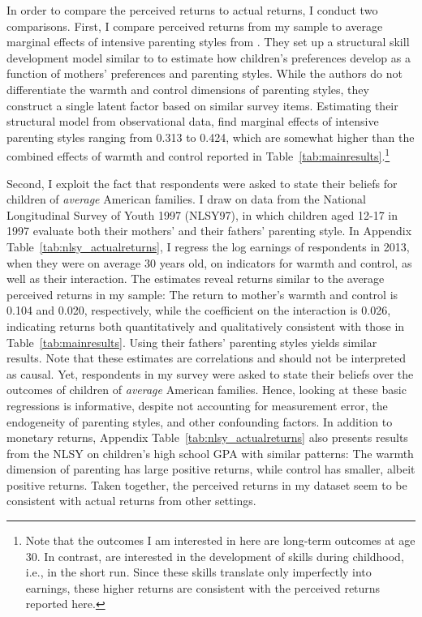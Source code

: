 \documentclass[12pt, a4paper, english]{article}
\begin{document}
In order to compare the perceived returns to actual returns, I conduct two comparisons. First, I compare perceived returns from my sample to average marginal effects of intensive parenting styles from \citet{Deckersetal2017Balu}. They set up a structural skill development model similar to \citet{Cunhaetal2010} to estimate how children's preferences develop as a function of mothers' preferences and parenting styles. While the authors do not differentiate the warmth and control dimensions of parenting styles, they construct a single latent factor based on similar survey items. Estimating their structural model from observational data, \citeauthor{Deckersetal2017Balu} find marginal effects of intensive parenting styles ranging from 0.313 to 0.424, which are somewhat higher than the combined effects of warmth and control reported in Table~\ref{tab:mainresults}.\footnote{Note that the outcomes I am interested in here are long-term outcomes at age 30. In contrast, \citet{Deckersetal2017Balu} are interested in the development of skills during childhood, i.e., in the short run. Since these skills translate only imperfectly into earnings, these higher returns are consistent with the perceived returns reported here.} 

Second, I exploit the fact that respondents were asked to state their beliefs for children of \textit{average} American families. I draw on data from the National Longitudinal Survey of Youth 1997 (NLSY97), in which children aged 12-17 in 1997 evaluate both their mothers' and their fathers' parenting style. In Appendix Table~\ref{tab:nlsy_actualreturns}, I regress the log earnings of respondents in 2013, when they were on average 30 years old, on indicators for warmth and control, as well as their interaction. The estimates reveal returns similar to the average perceived returns in my sample: The return to mother's warmth and control is 0.104 and 0.020, respectively, while the coefficient on the interaction is 0.026, indicating returns both quantitatively and qualitatively consistent with those in Table~\ref{tab:mainresults}. Using their fathers' parenting styles yields similar results. Note that these estimates are correlations and should not be interpreted as causal. Yet, respondents in my survey were asked to state their beliefs over the outcomes of children of \textit{average} American families. Hence, looking at these basic regressions is informative, despite not accounting for measurement error, the endogeneity of parenting styles, and other confounding factors. In addition to monetary returns, Appendix Table~\ref{tab:nlsy_actualreturns} also presents results from the NLSY on children's high school GPA with similar patterns: The warmth dimension of parenting has large positive returns, while control has smaller, albeit positive returns. Taken together, the perceived returns in my dataset seem to be consistent with actual returns from other settings.
\end{document}
